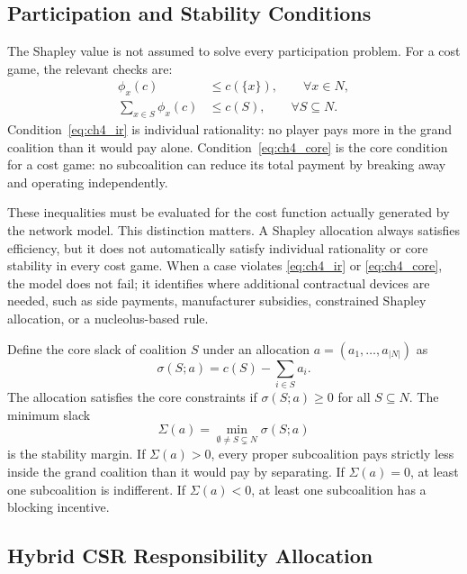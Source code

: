 \subsection{Participation and Stability Conditions}

The Shapley value is not assumed to solve every participation problem. For a cost game, the relevant checks are:
\begin{align}
\label{eq:ch4_ir}
\phi_x(c)&\leq c(\{x\}),
\qquad \forall x\in N,\\
\label{eq:ch4_core}
\sum_{x\in S}\phi_x(c)&\leq c(S),
\qquad \forall S\subseteq N.
\end{align}
Condition~\eqref{eq:ch4_ir} is individual rationality: no player pays more in the grand coalition than it would pay alone. Condition~\eqref{eq:ch4_core} is the core condition for a cost game: no subcoalition can reduce its total payment by breaking away and operating independently.

These inequalities must be evaluated for the cost function actually generated by the network model. This distinction matters. A Shapley allocation always satisfies efficiency, but it does not automatically satisfy individual rationality or core stability in every cost game. When a case violates \eqref{eq:ch4_ir} or \eqref{eq:ch4_core}, the model does not fail; it identifies where additional contractual devices are needed, such as side payments, manufacturer subsidies, constrained Shapley allocation, or a nucleolus-based rule.

Define the core slack of coalition $S$ under an allocation $a=(a_1,\ldots,a_{|N|})$ as
\begin{equation}
\label{eq:ch4_core_slack}
\sigma(S;a)=c(S)-\sum_{i\in S}a_i.
\end{equation}
The allocation satisfies the core constraints if $\sigma(S;a)\geq 0$ for all $S\subseteq N$. The minimum slack
\begin{equation}
\label{eq:ch4_stability_margin}
\Sigma(a)=\min_{\emptyset\neq S\subsetneq N}\sigma(S;a)
\end{equation}
is the stability margin. If $\Sigma(a)>0$, every proper subcoalition pays strictly less inside the grand coalition than it would pay by separating. If $\Sigma(a)=0$, at least one subcoalition is indifferent. If $\Sigma(a)<0$, at least one subcoalition has a blocking incentive.

\subsection{Hybrid CSR Responsibility Allocation}

